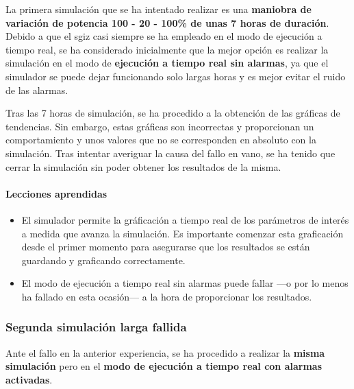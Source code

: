 La primera simulación que se ha intentado realizar es una \textbf{maniobra de variación de potencia 100 - 20 - 100\% de unas 7 horas de duración}. Debido a que el \acrshort{sgiz} casi siempre se ha empleado en el modo de ejecución a tiempo real, se ha considerado inicialmente que la mejor opción es realizar la simulación en el modo de \textbf{ejecución a tiempo real sin alarmas}, ya que el simulador se puede dejar funcionando solo largas horas y es mejor evitar el ruido de las alarmas.

Tras las 7 horas de simulación, se ha procedido a la obtención de las gráficas de tendencias. Sin embargo, estas gráficas son incorrectas y proporcionan un comportamiento y unos valores que no se corresponden en absoluto con la simulación. Tras intentar averiguar la causa del fallo en vano, se ha tenido que cerrar la simulación sin poder obtener los resultados de la misma.

\paragraph{Lecciones aprendidas}

\begin{itemize}
  \item El simulador permite la gráficación a tiempo real de los parámetros de interés a medida que avanza la simulación. Es importante comenzar esta graficación desde el primer momento para asegurarse que los resultados se están guardando y graficando correctamente.
  \item El modo de ejecución a tiempo real sin alarmas puede fallar ---o por lo menos ha fallado en esta ocasión--- a la hora de proporcionar los resultados.
\end{itemize}

\subsubsection{Segunda simulación larga fallida} \label{sim_larga_fallida}

Ante el fallo en la anterior experiencia, se ha procedido a realizar la \textbf{misma simulación} pero en el \textbf{modo de ejecución a tiempo real con alarmas activadas}.


